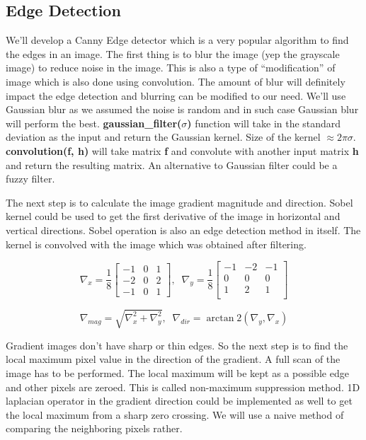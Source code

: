 \documentclass{report}
\begin{document}
\subsection{Edge Detection}
\hspace{\parindent}We'll develop a Canny Edge detector which is a very popular algorithm to find the edges in an image. The first thing is to blur the image (yep the grayscale image) to reduce noise in the image. This is also a type of ``modification'' of image which is also done using convolution. The amount of blur will definitely impact the edge detection and blurring can be modified to our need. We'll use Gaussian blur as we assumed the noise is random and in such case Gaussian blur will perform the best. \textbf{gaussian\_filter($\sigma$)} function will take in the standard deviation as the input and return the Gaussian kernel. Size of the kernel $\approx 2\pi\sigma$. \textbf{convolution(f, h)} will take matrix \textbf{f} and convolute with another input matrix \textbf{h} and return the resulting matrix. An alternative to Gaussian filter could be a fuzzy filter.

The next step is to calculate the image gradient magnitude and direction. Sobel kernel could be used to get the first derivative of the image in horizontal and vertical directions. Sobel operation is also an edge detection method in itself. The kernel is convolved with the image which was obtained after filtering.

\begin{equation}
\nabla_x = \frac{1}{8}
\begin{bmatrix}
-1 & 0 & 1\\
-2 & 0 & 2\\
-1 & 0 & 1
\end{bmatrix},\;\;
\nabla_y = \frac{1}{8}
\begin{bmatrix}
-1 & -2  & -1\\
 0 &  0  &  0\\
 1 &  2  &  1\\
\end{bmatrix}
\end{equation}

\begin{equation}
\nabla_{mag} = \sqrt{\nabla_x^{2} + \nabla_y^{2}},\;\;
\nabla_{dir} = \arctan2(\nabla_y, \nabla_x)
\end{equation}

Gradient images don't have sharp or thin edges. So the next step is to find the local maximum pixel value in the direction of the gradient. A full scan of the image has to be performed. The local maximum will be kept as a possible edge and other pixels are zeroed. This is called non-maximum suppression method. 1D laplacian operator in the gradient direction could be implemented as well to get the local maximum from a sharp zero crossing. We will use a naive method of comparing the neighboring pixels rather.
\end{document}
